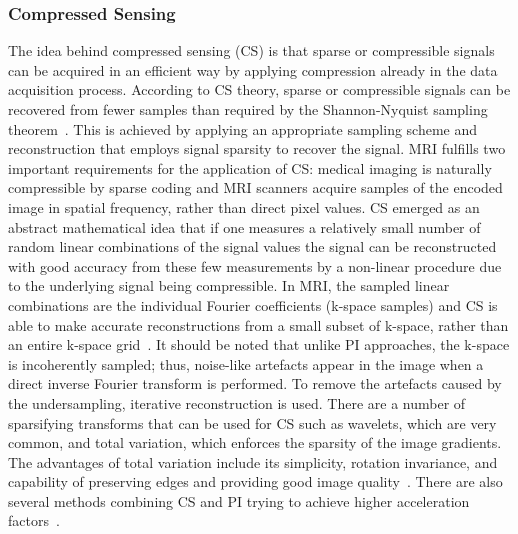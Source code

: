 \documentclass[english,version-2022-01]{uzl-thesis} %
\begin{document}
\subsubsection{Compressed Sensing}
The idea behind compressed sensing (CS) is that sparse or compressible signals can be acquired in an efficient way by applying compression already in the data acquisition process. According to CS theory, sparse or compressible signals can be recovered from fewer samples than required by the Shannon-Nyquist sampling theorem~\cite{CS-MRI}. This is achieved by applying an appropriate sampling scheme and reconstruction that employs signal sparsity to recover the signal. MRI fulfills two important requirements for the application of CS: medical imaging is naturally compressible by sparse coding and MRI scanners acquire samples of the encoded image in spatial frequency, rather than direct pixel values. CS emerged as an abstract mathematical idea that if one measures a relatively small number of random linear combinations of the signal values the signal can be reconstructed with good accuracy from these few measurements by a non-linear procedure due to the underlying signal being compressible.
In MRI, the sampled linear combinations are the individual Fourier coefficients (k-space samples) and CS is able to make accurate reconstructions from a small subset of k-space, rather than an entire k-space grid~\cite{CS-MRI}. It should be noted that unlike PI approaches, the k-space is incoherently sampled; thus, noise-like artefacts appear in the image when a direct inverse Fourier transform is performed. To remove the artefacts caused by the undersampling, iterative reconstruction is used. There are a number of sparsifying transforms that can be used for CS such as wavelets, which are very common, and total variation, which enforces the sparsity of the image gradients. The advantages of total variation include its simplicity, rotation invariance, and capability of preserving edges and providing good image quality~\cite{PulseSequences}. There are also several methods combining CS and PI trying to achieve higher acceleration factors~\cite{PI+CS, PI+CS2}.
\end{document}
